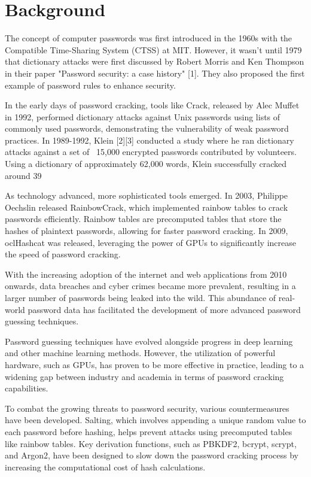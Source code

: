 \section{Background}
\label{chp5::sec::background}

The concept of computer passwords was first introduced in the 1960s with the Compatible Time-Sharing System (CTSS) at MIT. However, it wasn't until 1979 that dictionary attacks were first discussed by Robert Morris and Ken Thompson in their paper "Password security: a case history" [1]. They also proposed the first example of password rules to enhance security.

In the early days of password cracking, tools like Crack, released by Alec Muffet in 1992, performed dictionary attacks against Unix passwords using lists of commonly used passwords, demonstrating the vulnerability of weak password practices. In 1989-1992, Klein [2][3] conducted a study where he ran dictionary attacks against a set of ~15,000 encrypted passwords contributed by volunteers. Using a dictionary of approximately 62,000 words, Klein successfully cracked around 39%

As technology advanced, more sophisticated tools emerged. In 2003, Philippe Oechslin released RainbowCrack, which implemented rainbow tables to crack passwords efficiently. Rainbow tables are precomputed tables that store the hashes of plaintext passwords, allowing for faster password cracking. In 2009, oclHashcat was released, leveraging the power of GPUs to significantly increase the speed of password cracking.

With the increasing adoption of the internet and web applications from 2010 onwards, data breaches and cyber crimes became more prevalent, resulting in a larger number of passwords being leaked into the wild. This abundance of real-world password data has facilitated the development of more advanced password guessing techniques.

Password guessing techniques have evolved alongside progress in deep learning and other machine learning methods. However, the utilization of powerful hardware, such as GPUs, has proven to be more effective in practice, leading to a widening gap between industry and academia in terms of password cracking capabilities.

To combat the growing threats to password security, various countermeasures have been developed. Salting, which involves appending a unique random value to each password before hashing, helps prevent attacks using precomputed tables like rainbow tables. Key derivation functions, such as PBKDF2, bcrypt, scrypt, and Argon2, have been designed to slow down the password cracking process by increasing the computational cost of hash calculations.

